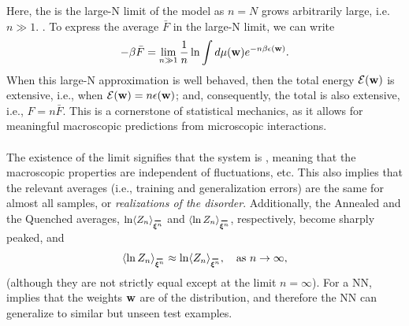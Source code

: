 {Here, the \ThermodynamicLimit is the large-N limit of the model as $n=N$
grows arbitrarily large, i.e. $n \gg 1$.
.
To express the average \FreeEnergy $\bar{F}$ in the large-N limit, we can write
\begin{align}
  -\beta\bar{F} = \lim_{n\gg 1}\frac{1}{n}\ln \int d\mu({\mathbf{w}}) e^{-n\beta\epsilon({\mathbf{w}})}  .
\end{align}
When this large-N approximation is well behaved,
then the total energy $\mathcal{E}(\mathbf{w})$ is extensive, i.e., when $\mathcal{E}(\mathbf{w})=n\epsilon({\mathbf{w}})$;
and, consequently, the total \FreeEnergy is also extensive, i.e., $F=n\bar{F}$.
This is a cornerstone of statistical mechanics,
as it allows for meaningful macroscopic predictions from microscopic interactions.

\paragraph{\SelfAveraging}

The existence of the limit signifies that the system is \emph{\SelfAveraging}, meaning that
the macroscopic properties are independent of fluctuations, etc.
This also implies that the relevant averages
(i.e., training and generalization errors) are the same for almost all samples, or \emph{realizations of the disorder}.
Additionally, the Annealed and the Quenched averages,
$\ln \langle Z_n \rangle_{\AVGNDXIn}$ and $\langle \ln Z_n \rangle_{\AVGNDXIn}$, respectively,
become sharply peaked, and
\begin{align}
\langle \ln Z_n \rangle_{\AVGNDXIn} \approx \ln \langle Z_n \rangle_{\AVGNDXIn}, \quad \text{as } n \to \infty,
\end{align}
(although they are not strictly equal except at the limit $n = \infty$).
For a NN, \SelfAveraging implies that the weights ${\mathbf{w}}$ are \emph{\Typical} of the distribution,
and therefore the NN can generalize to similar but unseen test examples.

}
